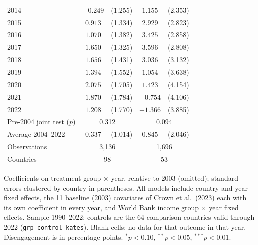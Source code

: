 \begin{table}[htbp]
\begin{tabular}{lcccc}
2014 & $-0.249$ & (1.255) & $1.155$ & (2.353) \\
2015 & $0.913$ & (1.334) & $2.929$ & (2.823) \\
2016 & $1.070$ & (1.382) & $3.425$ & (2.858) \\
2017 & $1.650$ & (1.325) & $3.596$ & (2.808) \\
2018 & $1.656$ & (1.431) & $3.036$ & (3.132) \\
2019 & $1.394$ & (1.552) & $1.054$ & (3.638) \\
2020 & $2.075$ & (1.705) & $1.423$ & (4.154) \\
2021 & $1.870$ & (1.784) & $-0.754$ & (4.106) \\
2022 & $1.208$ & (1.770) & $-1.366$ & (3.885) \\
\midrule
Pre-2004 joint test ($p$) & \multicolumn{2}{c}{0.312} & \multicolumn{2}{c}{0.094} \\
Average 2004--2022 & $0.337$ & (1.014) & $0.845$ & (2.046) \\
Observations & \multicolumn{2}{c}{3,136} & \multicolumn{2}{c}{1,696} \\
Countries & \multicolumn{2}{c}{98} & \multicolumn{2}{c}{53} \\
\bottomrule
\end{tabular}
\par\vspace{4pt}
\begin{minipage}{\textwidth}\footnotesize Coefficients on treatment group $\times$ year, relative to 2003 (omitted); standard errors clustered by country in parentheses. All models include country and year fixed effects, the 11 baseline (2003) covariates of Crown et al.\ (2023) each with its own coefficient in every year, and World Bank income group $\times$ year fixed effects. Sample 1990--2022; controls are the 64 comparison countries valid through 2022 (\texttt{grp\_control\_kates}). Blank cells: no data for that outcome in that year. Disengagement is in percentage points. $^{*}p<0.10$, $^{**}p<0.05$, $^{***}p<0.01$.\end{minipage}
\end{table}
